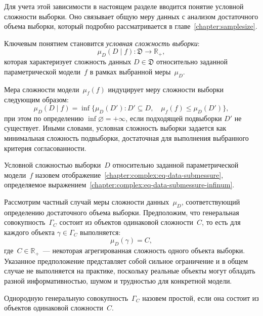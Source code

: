 Для учета этой зависимости в настоящем разделе вводится понятие условной сложности выборки. Оно связывает общую меру данных с анализом достаточного объема выборки, который подробно рассматривается в главе~\ref{chapter:samplesize}.

Ключевым понятием становится \textit{условная сложность выборки}:
\begin{equation}\label{chapter:complex:eq-data-submessure}
    \mu_D(D\mid f) : \mathfrak{D} \to \mathbb{R}_+,
\end{equation}
которая характеризует сложность данных $D\in\mathfrak{D}$ относительно заданной параметрической модели~$f$ в рамках выбранной меры~$\mu_D$.

Мера сложности модели~$\mu_f(f)$ индуцирует меру сложности выборки следующим образом:
\begin{equation}\label{chapter:complex:eq-data-submessure-infinum}
    \mu_D(D\mid f) = \inf \{ \mu_D(D') : D' \subseteq D, \quad \mu_f(f) \leq \mu_D(D') \},
\end{equation}
при этом по определению $\inf \varnothing = +\infty$, если подходящей подвыборки $D'$ не существует. Иными словами, условная сложность выборки задается как минимальная сложность подвыборки, достаточная для выполнения выбранного критерия согласованности.

\begin{definition}
    Условной сложностью выборки~$D$ относительно заданной параметрической модели~$f$ назовем отображение~\eqref{chapter:complex:eq-data-submessure}, определяемое выражением~\eqref{chapter:complex:eq-data-submessure-infinum}.
\end{definition}

Рассмотрим частный случай меры сложности данных~$\mu_D$, соответствующий определению достаточного объема выборки.
Предположим, что генеральная совокупность~$\Gamma_C$ состоит из объектов одинаковой сложности~$C$, то есть для каждого объекта $\gamma \in \Gamma_C$ выполняется:
\[
    \mu_D(\gamma) = C,
\]
где~$C\in\mathbb{R}_+$~--- некоторая агрегированная сложность одного объекта выборки. Указанное предположение представляет собой сильное ограничение и в общем случае не выполняется на практике, поскольку реальные объекты могут обладать разной информативностью, шумом и трудностью для конкретной модели.

\begin{definition}
    Однородную генеральную совокупность~$\Gamma_C$ назовем простой, если она состоит из объектов одинаковой сложности~$C.$
\end{definition}

